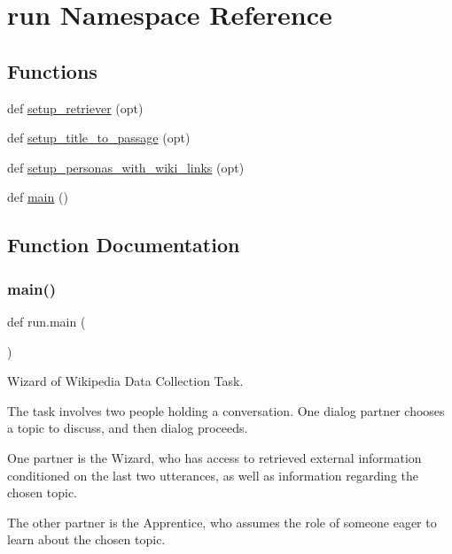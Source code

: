 \hypertarget{namespacerun}{}\section{run Namespace Reference}
\label{namespacerun}
\subsection*{Functions}
\begin{DoxyCompactItemize}
\item 
def \hyperlink{namespacerun_af213d4a09b8048dcf1e76b0cb75dcace}{setup\+\_\+retriever} (opt)
\item 
def \hyperlink{namespacerun_a8c0e38f5a5957dd35a11cc5d806887fd}{setup\+\_\+title\+\_\+to\+\_\+passage} (opt)
\item 
def \hyperlink{namespacerun_a4f4e30a0127c995cc883fd747c4eea15}{setup\+\_\+personas\+\_\+with\+\_\+wiki\+\_\+links} (opt)
\item 
def \hyperlink{namespacerun_aa82b870a20fb0f19feebf9c895b0cfd9}{main} ()
\end{DoxyCompactItemize}


\subsection{Function Documentation}
\mbox{\label{namespacerun_aa82b870a20fb0f19feebf9c895b0cfd9}} 
\subsubsection{\texorpdfstring{main()}{main()}}
{\footnotesize\ttfamily def run.\+main (\begin{DoxyParamCaption}{ }\end{DoxyParamCaption})}

\begin{DoxyVerb}    Wizard of Wikipedia Data Collection Task.

    The task involves two people holding a conversation. One dialog partner
    chooses a topic to discuss, and then dialog proceeds.

    One partner is the Wizard, who has access to retrieved external
    information conditioned on the last two utterances, as well as
    information regarding the chosen topic.

    The other partner is the Apprentice, who assumes the role of someone
    eager to learn about the chosen topic.
\end{DoxyVerb}


